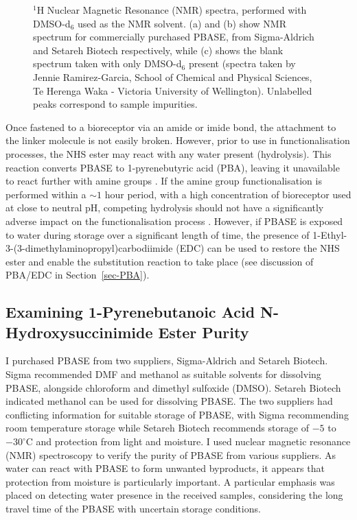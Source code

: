 \documentclass[
  a4paper,
]{scrbook}
\begin{document}
\begin{figure}
\begin{minipage}[t]{\linewidth}
{{}

}

\subcaption{\label{fig-dmso-nmr}}
\end{minipage}%

\caption{\label{fig-pbase-nmr}\(^{1}\)H Nuclear Magnetic Resonance (NMR)
spectra, performed with DMSO-d\(_6\) used as the NMR solvent. (a) and
(b) show NMR spectrum for commercially purchased PBASE, from
Sigma-Aldrich and Setareh Biotech respectively, while (c) shows the
blank spectrum taken with only DMSO-d\(_6\) present (spectra taken by
Jennie Ramirez-Garcia, School of Chemical and Physical Sciences, Te
Herenga Waka - Victoria University of Wellington). Unlabelled peaks
correspond to sample impurities.}

\end{figure}

Once fastened to a bioreceptor via an amide or imide bond, the
attachment to the linker molecule is not easily broken. However, prior
to use in functionalisation processes, the NHS ester may react with any
water present (hydrolysis). This reaction converts PBASE to
1-pyrenebutyric acid (PBA), leaving it unavailable to react further with
amine groups \autocite{Hermanson2013-3,Hermanson2013-5,Mishyn2022}. If
the amine group functionalisation is performed within a \(\sim1\) hour
period, with a high concentration of bioreceptor used at close to
neutral pH, competing hydrolysis should not have a significantly adverse
impact on the functionalisation process \autocite{Hermanson2013-3}.
However, if PBASE is exposed to water during storage over a significant
length of time, the presence of
1-Ethyl-3-(3-dimethylaminopropyl)carbodiimide (EDC) can be used to
restore the NHS ester and enable the substitution reaction to take place
(see discussion of PBA/EDC in Section~\ref{sec-PBA}).

\hypertarget{examining-1-pyrenebutanoic-acid-n-hydroxysuccinimide-ester-purity}{%
\subsection{Examining 1-Pyrenebutanoic Acid N-Hydroxysuccinimide Ester
Purity}\label{examining-1-pyrenebutanoic-acid-n-hydroxysuccinimide-ester-purity}}

I purchased PBASE from two suppliers, Sigma-Aldrich and Setareh Biotech.
Sigma recommended DMF and methanol as suitable solvents for dissolving
PBASE, alongside chloroform and dimethyl sulfoxide (DMSO). Setareh
Biotech indicated methanol can be used for dissolving PBASE. The two
suppliers had conflicting information for suitable storage of PBASE,
with Sigma recommending room temperature storage while Setareh Biotech
recommends storage of \(-5\) to \(-30 ^\circ \text{C}\) and protection
from light and moisture. I used nuclear magnetic resonance (NMR)
spectroscopy to verify the purity of PBASE from various suppliers. As
water can react with PBASE to form unwanted byproducts, it appears that
protection from moisture is particularly important. A particular
emphasis was placed on detecting water presence in the received samples,
considering the long travel time of the PBASE with uncertain storage
conditions.
\end{document}
